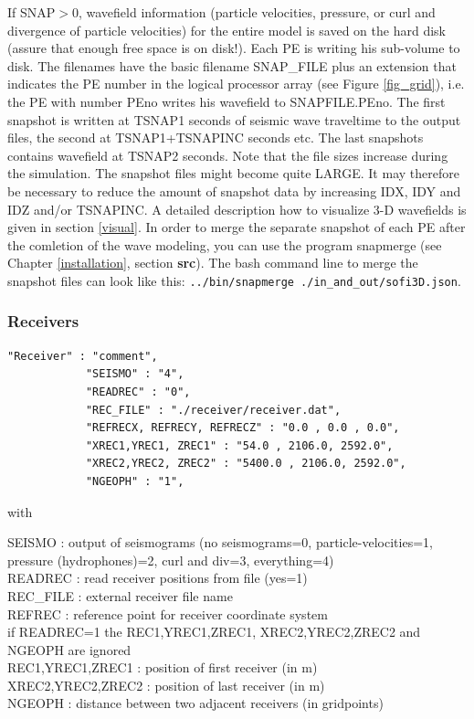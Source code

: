 \documentclass[11pt,onecolumn,oneside]{article}
\begin{document}
If SNAP$>0$, wavefield information (particle velocities, pressure, or curl and divergence of particle velocities) for the entire model is saved on the hard disk (assure that enough free space is on disk!). Each PE is writing his sub-volume to disk. The filenames have the basic filename SNAP\_FILE plus an extension that indicates the PE number in the logical processor array (see Figure \ref{fig_grid}), i.e. the PE with number PEno writes his wavefield to SNAPFILE.PEno. The first snapshot is written at TSNAP1 seconds of seismic wave traveltime to the output files, the second at TSNAP1+TSNAPINC seconds etc. The last snapshots contains wavefield at TSNAP2 seconds. Note that the file sizes increase during the simulation. The snapshot files might become quite LARGE. It may therefore be necessary to reduce the amount of snapshot data by increasing IDX, IDY and IDZ and/or TSNAPINC. A detailed description how to visualize 3-D wavefields is given in section \ref{visual}. In order to merge the separate snapshot of each PE after the comletion of the wave modeling, you can use the program snapmerge (see Chapter \ref{installation}, section \textbf{src}). The bash command line to merge the snapshot files can look like this:  \lstinline{../bin/snapmerge ./in_and_out/sofi3D.json}.

\subsubsection{Receivers}
\label{Receivers}
\begin{verbatim}
"Receiver" : "comment",
			"SEISMO" : "4",
			"READREC" : "0",
			"REC_FILE" : "./receiver/receiver.dat",
			"REFRECX, REFRECY, REFRECZ" : "0.0 , 0.0 , 0.0",
			"XREC1,YREC1, ZREC1" : "54.0 , 2106.0, 2592.0",
			"XREC2,YREC2, ZREC2" : "5400.0 , 2106.0, 2592.0",
			"NGEOPH" : "1",
\end{verbatim}

with 

SEISMO : output of seismograms (no seismograms=0, particle-velocities=1, pressure (hydrophones)=2, curl and div=3, everything=4)\\
READREC : read receiver positions from file (yes=1)\\
REC\_FILE : external receiver file name\\
REFREC : reference point for receiver coordinate system\\
if READREC=1 the REC1,YREC1,ZREC1, XREC2,YREC2,ZREC2 and NGEOPH are ignored\\ 
REC1,YREC1,ZREC1 : position of first receiver (in m)\\
XREC2,YREC2,ZREC2 : position of last receiver (in m)\\
NGEOPH : distance between two adjacent receivers (in gridpoints)\\
\end{document}
